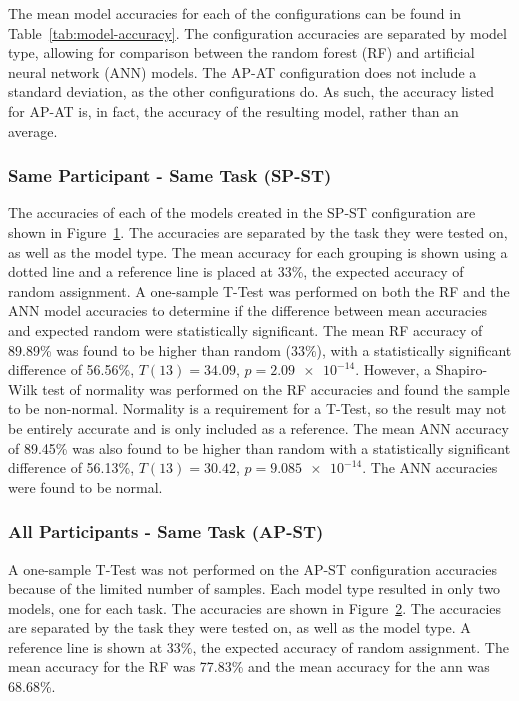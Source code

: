\documentclass[11pt]{article}
\begin{document}
	
	The mean model accuracies for each of the configurations can be found in Table~\ref{tab:model-accuracy}. The configuration accuracies are separated by model type, allowing for comparison between the random forest (RF) and artificial neural network (ANN) models. The AP-AT configuration does not include a standard deviation, as the other configurations do. As such, the accuracy listed for AP-AT is, in fact, the accuracy of the resulting model, rather than an average.
	
		\subsubsection{Same Participant - Same Task (SP-ST)}
		The accuracies of each of the models created in the SP-ST configuration are shown in Figure~\ref{fig:sp-st}. The accuracies are separated by the task they were tested on, as well as the model type. The mean accuracy for each grouping is shown using a dotted line and a reference line is placed at 33\%, the expected accuracy of random assignment. A one-sample T-Test was performed on both the RF and the ANN model accuracies to determine if the difference between mean accuracies and expected random were statistically significant. The mean RF accuracy of 89.89\% was found to be higher than random (33\%), with a statistically significant difference of 56.56\%,  \(T(13) = 34.09\), \(p = \num{2.09e-14}\). However, a Shapiro-Wilk test of normality was performed on the RF accuracies and found the sample to be non-normal. Normality is a requirement for a T-Test, so the result may not be entirely accurate and is only included as a reference. The mean ANN accuracy of 89.45\% was also found to be higher than random with a statistically significant difference of 56.13\%, \(T(13) = 30.42\), \(p = \num{9.085e-14}\). The ANN accuracies were found to be normal.
		
		\begin{figure}
		\centering
		\caption{}
		\label{fig:sp-st}
		\end{figure} 
		
		\subsubsection{All Participants - Same Task (AP-ST)}
		A one-sample T-Test was not performed on the AP-ST configuration accuracies because of the limited number of samples. Each model type resulted in only two models, one for each task. The accuracies are shown in Figure~\ref{fig:ap-st}. The accuracies are separated by the task they were tested on, as well as the model type. A reference line is shown at 33\%, the expected accuracy of random assignment. The mean accuracy for the RF was 77.83\% and the mean accuracy for the ann was 68.68\%.
		\begin{figure}
		\centering
		\caption{}
		\label{fig:ap-st}
		\end{figure} 
		
\end{document}
